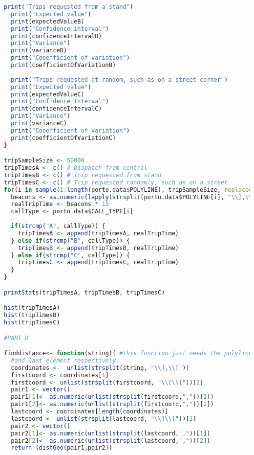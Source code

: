 \documentclass{article}
\begin{document}
\begin{lstlisting}[language=R]
  print("Trips requested from a stand")
  print("Expected value")
  print(expectedValueB)
  print("Confidence interval")
  print(confidenceIntervalB)
  print("Variance")
  print(varianceB)
  print("Cooefficient of variation")
  print(coefficientOfVariationB)
  
  print("Trips requested at random, such as on a street corner")
  print("Expected value")
  print(expectedValueC)
  print("Confidence Interval")
  print(confidenceIntervalC)
  print("Variance")
  print(varianceC)
  print("Cooefficient of variation")
  print(coefficientOfVariationC)
}

tripSampleSize <- 50000
tripTimesA <- c() # Dispatch from central
tripTimesB <- c() # Trip requested from stand
tripTimesC <- c() # Trip requested randomly, such as on a street
for(i in sample(1:length(porto.data$POLYLINE), tripSampleSize, replace=TRUE)) {
  beacons <- as.numeric(lapply(strsplit(porto.data$POLYLINE[i], "\\],\\["), length)) 
  realTripTime <- beacons * 15
  callType <- porto.data$CALL_TYPE[i]
  
  if(strcmp("A", callType)) {
    tripTimesA <- append(tripTimesA, realTripTime)
  } else if(strcmp("B", callType)) {
    tripTimesB <- append(tripTimesB, realTripTime)
  } else if(strcmp("C", callType)) {
    tripTimesC <- append(tripTimesC, realTripTime)
  }
}

printStats(tripTimesA, tripTimesB, tripTimesC)

hist(tripTimesA)
hist(tripTimesB)
hist(tripTimesC)

#PART D

finddistance<- function(string){ #this function just needs the polyline, we will then strip away the first two brackets, and last two brackets on the first
  #and last element respectively.
  coordinates <-  unlist(strsplit(string, "\\],\\["))
  firstcoord <- coordinates[1]
  firstcoord <- unlist(strsplit(firstcoord, "\\[\\["))[2]
  pair1 <- vector()
  pair1[1]<- as.numeric(unlist(strsplit(firstcoord,","))[1])
  pair1[2]<- as.numeric(unlist(strsplit(firstcoord,","))[2])
  lastcoord <- coordinates[length(coordinates)]
  lastcoord <- unlist(strsplit(lastcoord, "\\]\\]"))[1]
  pair2 <- vector()
  pair2[1]<- as.numeric(unlist(strsplit(lastcoord,","))[1])
  pair2[2]<- as.numeric(unlist(strsplit(lastcoord,","))[2])
  return (distGeo(pair1,pair2))
  

\end{lstlisting}
\end{document}
